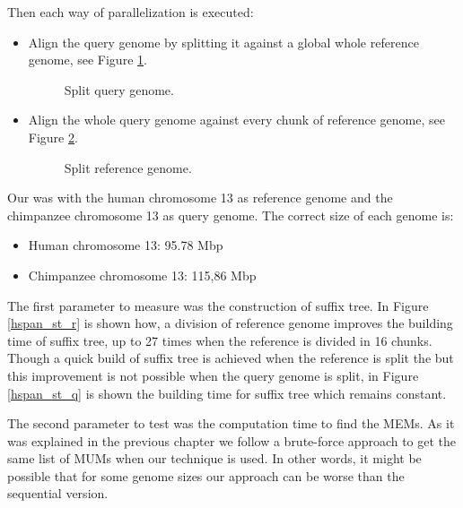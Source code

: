 \documentclass[twocolumn,twoside]{Jornadas}
\begin{document}
Then each way of parallelization is executed:
\begin{itemize}
\item Align the query genome by splitting it against a global whole reference genome, see Figure \ref{splitqry}.
\begin{figure}[htb] 
  \begin{center}
  \end{center}
 \caption{Split query genome.}
 \label{splitqry}
\end{figure}
\item Align the whole query genome against every chunk of reference genome, see Figure \ref{splitref}.
\begin{figure}[htb]
  \begin{center}
  \end{center}
 \caption{Split reference genome.}
 \label{splitref}
\end{figure}
\end{itemize}
Our was with the human chromosome 13 as reference genome and the chimpanzee chromosome 13 as query genome. The correct size of each genome is:
\begin{itemize}
  \item Human chromosome 13: 95.78 Mbp
  \item Chimpanzee chromosome 13: 115,86 Mbp
\end{itemize}
The first parameter to measure was the construction of suffix tree. In Figure \ref{hspan_st_r} is shown how, a division of reference genome improves the building time of suffix tree, up to 27 times when the reference is divided in 16 chunks. Though a quick build of suffix tree is achieved when the reference is split the but this improvement is not possible when the query genome is split, in Figure \ref{hspan_st_q} is shown the building time for suffix tree which remains constant.
\begin{figure}[htb] 
\centering
{}
\hspace{0.1cm}
\end{figure}
The second parameter to test was the computation time to find the MEMs. As it was explained in the previous chapter we follow a brute-force approach to get the same list of MUMs when our technique is used. In other words, it might be possible that for some genome sizes our approach can be worse than the sequential version.\\
\end{document}
